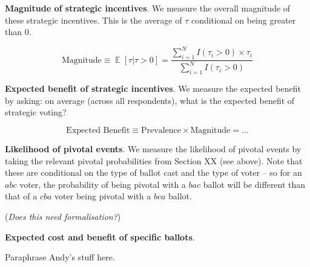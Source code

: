 \documentclass[12pt, letter]{article}
\DeclareMathOperator{\EX}{\mathbb{E}} %
\begin{document}
\textbf{Magnitude of strategic incentives}. We measure the overall magnitude of these strategic incentives. This is the average of $\tau$ conditional on being greater than $0$.

\begin{equation}
	\text{Magnitude} \equiv \EX[\tau | \tau > 0] = \frac{\sum^N_{i = 1} I(\tau_i > 0) \times \tau_i}{\sum^N_{i = 1} I(\tau_i > 0)}
\end{equation}

\textbf{Expected benefit of strategic incentives}. We measure the expected benefit by asking: on average (across all respondents), what is the expected benefit of strategic voting?

\begin{equation}
	\text{Expected Benefit} \equiv \text{Prevalence} \times \text{Magnitude} = ...
\end{equation}

\textbf{Likelihood of pivotal events}. We measure the likelihood of pivotal events by taking the relevant pivotal probabilities from Section XX (see above). Note that these are conditional on the type of ballot cast and the type of voter -- so for an $abc$ voter, the probability of being pivotal with a $bac$ ballot will be different than that of a $cba$ voter being pivotal with a $bca$ ballot.

(\emph{Does this need formalisation?})

\textbf{Expected cost and benefit of specific ballots}.

Paraphrase Andy's stuff here.





\end{document}
